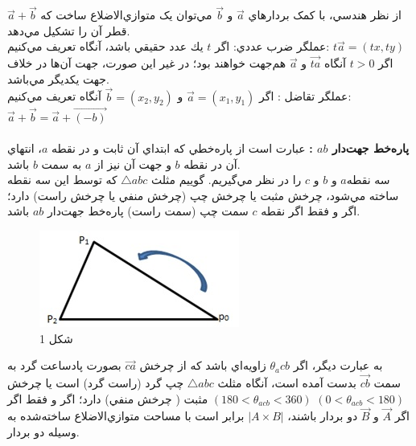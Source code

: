 \documentclass{book}
\begin{document}
 از نظر هندسي، با کمک بردارهاي 
 $\vec{a}$
 و
 $\vec{b}$
  مي‌توان يک متوازي‌الاضلاع ساخت که
   $\vec{a}+\vec{b}$
قطر آن را تشكيل مي‌دهد.\\

 عملگر ضرب عددي:  اگر $t$ يك عدد حقيقي باشد، آنگاه تعريف مي‌كنيم: 
 $t\vec{a} = (tx,ty)$
 \\

 اگر
 $t>0$
  آنگاه
   $\vec{ta}$
   و
    $\vec{a}$
  هم‌جهت خواهند بود؛ در غير اين صورت، جهت آن‌ها در خلاف جهت يكديگر مي‌باشد.\\

  عملگر تقاضل : اگر 
  $\vec{a} = (x_{1},y_{1})$
  و
  $\vec{b} = (x_{2},y_{2})$
  آنگاه  تعريف مي‌کنيم: 
  $\vec{a}+\vec{b} = \vec{a}+\vec{(-b)}$
  \\
  \\

  \textbf{
  	 پاره‌خط جهت‌دار $ab$ :
  	}
  عبارت است از پاره‌خطي که ابتداي آن ثابت و در نقطه $a$، انتهاي آن در نقطه $b$ و جهت آن نيز از $a$ به سمت $b$ باشد. \\
  سه نقطه$a$ و $b$ و $c$  را در نظر مي‌گيريم. گوييم مثلث
  $\triangle abc$ 
   که توسط اين سه نقطه ساخته مي‌شود، چرخش مثبت يا چرخش چپ (چرخش منفي يا چرخش راست) دارد؛ اگر و فقط اگر  نقطه $c$ سمت چپ (سمت راست) پاره‌خط جهت‌دار $ab$ باشد. 
   \begin{figure}[h]
   			\begin{center}
   			\includegraphics{1.jpg}
		   	\caption{شکل 1}
   		\end{center}
   	\label{شکل 1}
   \end{figure}
به عبارت ديگر، اگر  
$\theta_acb$
 زاويه‌اي باشد که از چرخش 
 $\vec{ca}$
 بصورت پادساعت گرد به سمت 
  $\vec{cb}$
  بدست آمده است، آنگاه مثلث   
  $\triangle abc$ 
   چپ گرد (راست گرد) است يا چرخش مثبت ( چرخش منفي) دارد؛ اگر و فقط اگر 
   $(180<\theta_{acb}<360)$  
      $(0<\theta_{acb}<180)$  
      \\
      
      اگر 
        $\vec{A}$
        و
                $\vec{B}$
      دو بردار باشند،
      $|A\times B|$
       برابر است با مساحت متوازي‌الاضلاع ساخته‌شده به وسيله دو بردار. \\
       
\end{document}
